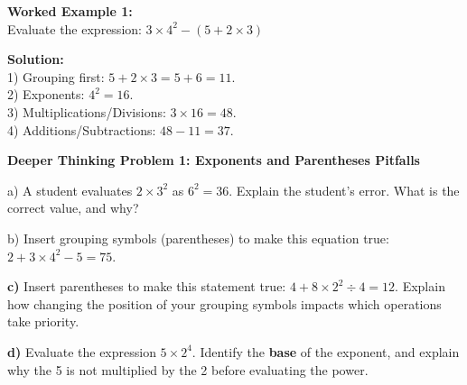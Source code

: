 \documentclass[12pt, letterpaper, fleqn]{article}
\begin{document}
\vspace{3mm}

\begin{tcolorbox}[colback=white, colframe=black!25, boxrule=0.6pt, arc=4mm, left=6mm, right=6mm, top=5mm, bottom=5mm]
\textbf{Worked Example 1:}
\vspace{0.5cm}
\medskip
\noindent
\vspace{0.2cm} \\
Evaluate the expression: $3 \times 4^2 - (5 + 2 \times 3)$\\
\vspace{0.5cm}

\textbf{Solution:} \\
1) Grouping first: $5 + 2 \times 3 = 5 + 6 = 11$. \\
2) Exponents: $4^2 = 16$. \\
3) Multiplications/Divisions: $3 \times 16 = 48$. \\
4) Additions/Subtractions: $48 - 11 = 37$.
\vspace{0.5cm}
\end{tcolorbox}

\vspace{4mm}

\begin{tcolorbox}[colback=white, colframe=black, boxrule=1pt, arc=4mm, left=6mm, right=6mm, top=5mm, bottom=5mm]
\textbf{Deeper Thinking Problem 1: Exponents and Parentheses Pitfalls}

\medskip

\noindent
a) A student evaluates $2 \times 3^2$ as $6^2 = 36$. Explain the student's error. What is the correct value, and why?

\vspace{3cm}

\noindent
b) Insert grouping symbols (parentheses) to make this equation true: $2 + 3 \times 4^2 - 5 = 75$.

\vspace{4cm}

\noindent
\textbf{c)} Insert parentheses to make this statement true: $4 + 8 \times 2^2 \div 4 = 12$. Explain how changing the position of your grouping symbols impacts which operations take priority.

\vspace{3cm}

\noindent
\textbf{d)} Evaluate the expression $5 \times 2^4$. Identify the \textbf{base} of the exponent, and explain why the 5 is not multiplied by the 2 before evaluating the power.

\vspace{4cm}
\end{tcolorbox}
\newpage
\end{document}
